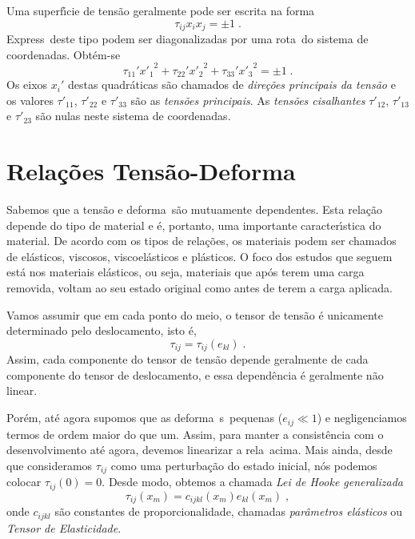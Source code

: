 Uma superf\'{\i}cie de tens\~ao geralmente pode ser escrita na
forma
\begin{equation}
\tau_{ij} x_i x_j = \pm 1 \;.
\end{equation}
Express\oes\ deste tipo podem ser diagonalizadas por uma rota\cao\ do
sistema de coordenadas. Obt\'em-se
\begin{equation}
\tau_{11}' {x'_1}^2 + \tau_{22}' {x'_2}^2 +
\tau_{33}' {x'_3}^2 = \pm 1 \;.
\end{equation}
Os eixos $x_i'$ destas quadr\'aticas s\~ao chamados de {\it
dire\c{c}\~oes principais da tens\~ao} e os valores
$\tau'_{11}$, $\tau'_{22}$ e $\tau'_{33}$ s\~ao as {\it
tens\~oes principais}. As {\it tens\~oes cisalhantes} $\tau'_{12}$,
$\tau'_{13}$ e $\tau'_{23}$ s\~ao nulas neste sistema
de coordenadas.



\section{Rela\c{c}\~oes Tens\~ao-Deforma\cao}

Sabemos que a tens\~ao e deforma\cao\ s\~ao mutuamente
dependentes. Esta rela\c{c}\~ao depende do tipo de material e \'e,
portanto, uma importante caracter\'{\i}stica do material. De
acordo com os tipos de rela\c{c}\~oes, os materiais podem ser
chamados de el\'asticos, viscosos, viscoel\'asticos e pl\'asticos.
O foco dos estudos que seguem est\'a nos materiais el\'asticos, ou
seja, materiais que ap\'os terem uma carga removida, voltam ao seu
estado original como antes de terem a carga aplicada.

Vamos assumir que em cada ponto do meio, o tensor de tens\~ao \'e
unicamente determinado pelo deslocamento, isto \'e,
\begin{equation}
\tau_{ij}=\tau_{ij}(e_{kl}) \;.
\label{rel_tens_def}
\end{equation}
Assim, cada componente do tensor de tens\~ao depende geralmente de
cada componente do tensor de deslocamento, e essa depend\^encia
\'e geralmente n\~ao linear.

Por\'em, at\'e agora supomos que as deforma\coes\ s\ao\ pequenas
($e_{ij}\ll 1$) e negligenciamos termos de ordem maior do que um. Assim,
para manter a consist\^encia com o desenvolvimento at\'e agora, devemos
linearizar a rela\cao\ acima. Mais ainda, desde que consideramos
$\tau_{ij}$ como uma perturba\c{c}\~ao do estado inicial, n\'os podemos
colocar $\tau_{ij}(0)=0$. Desde modo, obtemos a chamada {\it Lei de Hooke
generalizada}
\begin{equation}
\tau_{ij}(x_m)=c_{ijkl}(x_m)e_{kl} (x_m) \;,
\label{lei_hooke}
\end{equation}
onde $c_{ijkl}$ s\~ao constantes de proporcionalidade, chamadas {\it
par\^ametros el\'asticos} ou {\it Tensor de Elasticidade}.

